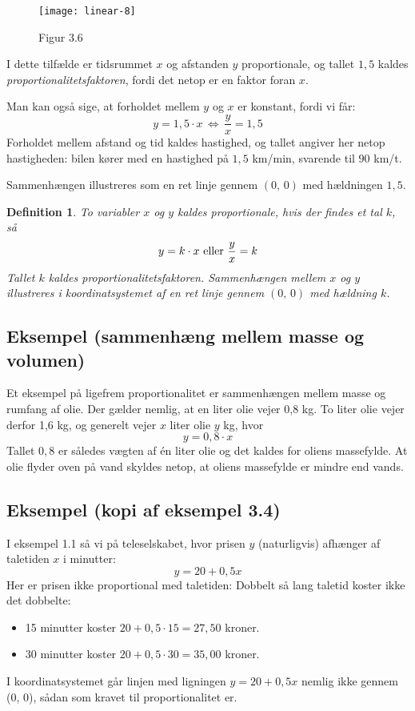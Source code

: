 \documentclass[12pt,oneside,a4paper]{article}
\newtheorem{mydef}[thm]{Definition}
\begin{document}
\begin{figure}[ht]
    \centering
    \texttt{[image: linear-8]}
    \caption{Figur 3.6}
    \label{fig36}
\end{figure}

I dette tilfælde er tidsrummet $x$ og afstanden $y$ proportionale, og tallet
$1,5$ kaldes {\em proportionalitetsfaktoren}, fordi det netop er en faktor foran $x$.

Man kan også sige, at forholdet mellem $y$ og $x$ er konstant, fordi vi får:
$$
y = 1,5\cdot x \, \Leftrightarrow \, \frac{y}{x} = 1,5
$$
Forholdet mellem afstand og tid kaldes hastighed, og tallet angiver her netop
hastigheden: bilen kører med en hastighed på $1,5$ km/min, svarende til $90$
km/t.

Sammenhængen illustreres som en ret linje gennem $(0,\,0)$ med hældningen $1,5$.

\begin{mydef}
    To variabler $x$ og $y$ kaldes proportionale, hvis der findes et tal $k$, så
    $$
    y = k\cdot x \,\, {\rm eller} \,\, \frac{y}{x} = k
    $$
    Tallet $k$ kaldes proportionalitetsfaktoren. Sammenhængen mellem $x$ og $y$
    illustreres i koordinatsystemet af en ret linje gennem $(0,\,0)$ med 
    hældning $k$.
\end{mydef}

\subsection{Eksempel (sammenhæng mellem masse og volumen)}

Et eksempel på ligefrem proportionalitet er sammenhængen mellem masse og rumfang af olie.
Der gælder nemlig, at en liter olie vejer 0,8 kg. To liter olie vejer derfor 1,6 kg,
og generelt vejer $x$ liter olie $y$ kg, hvor
$$
y = 0,8 \cdot x
$$
Tallet $0,8$ er således vægten af én liter olie og det kaldes for oliens
massefylde.  At olie flyder oven på vand skyldes netop, at oliens massefylde er
mindre end vands.

\subsection{Eksempel (kopi af eksempel 3.4)}
I eksempel 1.1 så vi på teleselskabet, hvor prisen $y$ (naturligvis) afhænger af
taletiden $x$ i minutter:
$$
y=20+0,5x
$$
Her er prisen ikke proportional med taletiden: Dobbelt så lang taletid koster ikke
det dobbelte:
\begin{itemize}
    \item 15 minutter koster $20+0,5\cdot 15 = 27,50$ kroner.
    \item 30 minutter koster $20+0,5\cdot 30 = 35,00$ kroner.
\end{itemize}
I koordinatsystemet går linjen med ligningen $y=20+0,5x$ nemlig ikke gennem (0, 0),
sådan som kravet til proportionalitet er.
\end{document}
